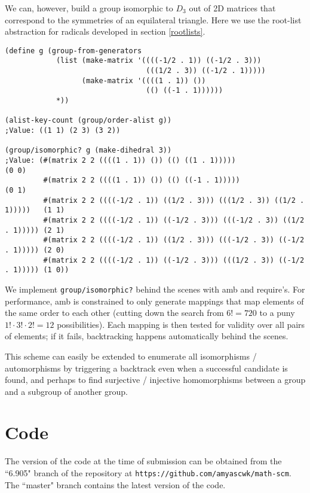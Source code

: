 \documentclass{article}
\begin{document}
            We can, however, build a group isomorphic to $D_3$ out of 2D matrices that correspond to the symmetries of an equilateral triangle. Here we use the root-list abstraction for radicals developed in section \ref{rootlists}.
		
\begin{verbatim}
(define g (group-from-generators
     	    (list (make-matrix '((((-1/2 . 1)) ((-1/2 . 3)))
				                 (((1/2 . 3)) ((-1/2 . 1)))))
		          (make-matrix '((((1 . 1)) ())
				                 (() ((-1 . 1))))))
	        *))

(alist-key-count (group/order-alist g))
;Value: ((1 1) (2 3) (3 2))

(group/isomorphic? g (make-dihedral 3))
;Value: (#(matrix 2 2 ((((1 . 1)) ()) (() ((1 . 1)))))                          (0 0) 
         #(matrix 2 2 ((((1 . 1)) ()) (() ((-1 . 1)))))                         (0 1) 
         #(matrix 2 2 ((((-1/2 . 1)) ((1/2 . 3))) (((1/2 . 3)) ((1/2 . 1)))))   (1 1)
         #(matrix 2 2 ((((-1/2 . 1)) ((-1/2 . 3))) (((-1/2 . 3)) ((1/2 . 1))))) (2 1) 
         #(matrix 2 2 ((((-1/2 . 1)) ((1/2 . 3))) (((-1/2 . 3)) ((-1/2 . 1))))) (2 0) 
         #(matrix 2 2 ((((-1/2 . 1)) ((-1/2 . 3))) (((1/2 . 3)) ((-1/2 . 1))))) (1 0))
\end{verbatim}
		
            We implement \texttt{group/isomorphic?} behind the scenes with amb and require's. For performance, amb is constrained to only generate mappings that map elements of the same order to each other (cutting down the search from $6! = 720$ to a puny $1! \cdot 3! \cdot 2! = 12$ possibilities). Each mapping is then tested for validity over all pairs of elements; if it fails, backtracking happens automatically behind the scenes.
		
            This scheme can easily be extended to enumerate all isomorphisms / automorphisms by triggering a backtrack even when a successful candidate is found, and perhaps to find surjective / injective homomorphisms between a group and a subgroup of another group.    
    
    \section{Code}
        
        The version of the code at the time of submission can be obtained from the ``6.905" branch of the repository at \texttt{https://github.com/amyascwk/math-scm}. The ``master" branch contains the latest version of the code.
        
    
    
\end{document}
